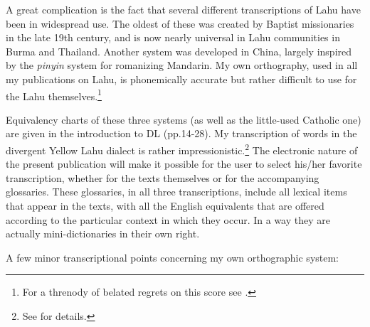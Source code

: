 A great complication is the fact that several different transcriptions
of Lahu have been in widespread use. The oldest of these was created
by Baptist missionaries in the late 19th century, and is now nearly
universal in Lahu communities in Burma and Thailand. Another system
was developed in China, largely inspired by the \emph{pinyin} system for
romanizing Mandarin. My own orthography, used in all my publications
on Lahu, is phonemically accurate but rather difficult to use for the
Lahu themselves.\footnote{For a threnody of belated regrets on this score see
  \citet{matisoff2014}.}

Equivalency charts of these three systems (as well as the little-used
Catholic one) are given in the introduction to DL (pp.14-28). My
transcription of words in the divergent Yellow Lahu dialect is rather
impressionistic.\footnote{See \citet{matisoff1969lahu} for details.}
The electronic nature of the present publication will make it possible
for the user to select his/her favorite transcription, whether for the
texts themselves or for the accompanying glossaries. These glossaries,
in all three transcriptions, include all lexical items that appear in
the texts, with all the English equivalents that are offered according
to the particular context in which they occur. In a way they are
actually mini-dictionaries in their own right.

A few minor transcriptional points concerning my own orthographic system:

